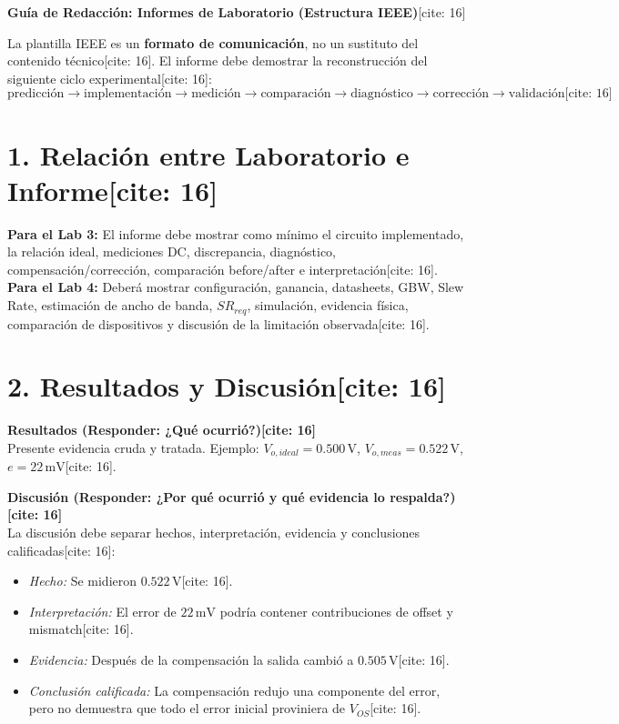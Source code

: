 \documentclass[11pt, a4paper]{article}
\begin{document}
\begin{center}
    \Large\textbf{\textcolor{ucbblue}{Guía de Redacción: Informes de Laboratorio (Estructura IEEE)}}[cite: 16]
\end{center}

\begin{tcolorbox}[colback=yellow!5, colframe=ucbblue, title=\textbf{El Formato IEEE en este Curso}]
    La plantilla IEEE es un \textbf{formato de comunicación}, no un sustituto del contenido técnico[cite: 16]. El informe debe demostrar la reconstrucción del siguiente ciclo experimental[cite: 16]:
    \begin{equation*}
        \boxed{ \text{predicción} \rightarrow \text{implementación} \rightarrow \text{medición} \rightarrow \text{comparación} \rightarrow \text{diagnóstico} \rightarrow \text{corrección} \rightarrow \text{validación} } \text{[cite: 16]}
    \end{equation*}
\end{tcolorbox}

\section*{1. Relación entre Laboratorio e Informe[cite: 16]}
\textbf{Para el Lab 3:} El informe debe mostrar como mínimo el circuito implementado, la relación ideal, mediciones DC, discrepancia, diagnóstico, compensación/corrección, comparación before/after e interpretación[cite: 16]. \\
\textbf{Para el Lab 4:} Deberá mostrar configuración, ganancia, datasheets, GBW, Slew Rate, estimación de ancho de banda, $SR_{req}$, simulación, evidencia física, comparación de dispositivos y discusión de la limitación observada[cite: 16].

\section*{2. Resultados y Discusión[cite: 16]}
\textbf{Resultados (Responder: ¿Qué ocurrió?)[cite: 16]} \\
Presente evidencia cruda y tratada. Ejemplo: $V_{o,ideal} = 0.500\,\text{V}$, $V_{o,meas} = 0.522\,\text{V}$, $e = 22\,\text{mV}$[cite: 16].

\textbf{Discusión (Responder: ¿Por qué ocurrió y qué evidencia lo respalda?)[cite: 16]} \\
La discusión debe separar hechos, interpretación, evidencia y conclusiones calificadas[cite: 16]:
\begin{itemize}
    \item \textit{Hecho:} Se midieron $0.522\,\text{V}$[cite: 16].
    \item \textit{Interpretación:} El error de $22\,\text{mV}$ podría contener contribuciones de offset y mismatch[cite: 16].
    \item \textit{Evidencia:} Después de la compensación la salida cambió a $0.505\,\text{V}$[cite: 16].
    \item \textit{Conclusión calificada:} La compensación redujo una componente del error, pero no demuestra que todo el error inicial proviniera de $V_{OS}$[cite: 16].
\end{itemize}
\end{document}
